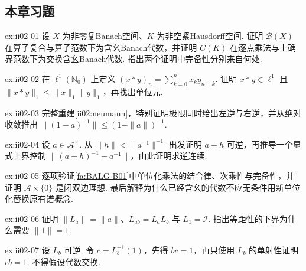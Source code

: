\subsection*{本章习题}\label{sec:ii02-exercises}

\begin{FAExercise}[Banach代数基本例]{ex:ii02-01}
设 \(\displaystyle X\) 为非零复Banach空间、\(\displaystyle K\) 为非空紧Hausdorff空间. 证明 \(\displaystyle\mathcal B(X)\) 在算子复合与算子范数下为含幺Banach代数，并证明 \(\displaystyle C(K)\) 在逐点乘法与上确界范数下为交换含幺Banach代数. 指出两个证明中完备性分别来自何处.
\end{FAExercise}

\begin{FAExercise}[卷积Banach代数]{ex:ii02-02}
在 \(\displaystyle\ell^1(\mathbb N_0)\) 上定义 \(\displaystyle(x*y)_n=\sum_{k=0}^{n}x_k y_{n-k}\). 证明 \(\displaystyle x*y\in\ell^1\) 且 \(\displaystyle\|x*y\|_1\leqslant\|x\|_1\|y\|_1\)，再找出单位元.
\end{FAExercise}

\begin{FAExercise}[Neumann级数]{ex:ii02-03}
完整重建\autoref{ii02:neumann}，特别证明极限同时给出左逆与右逆，并从绝对收敛推出 \(\displaystyle\|(1-a)^{-1}\|\leqslant(1-\|a\|)^{-1}\).
\end{FAExercise}

\begin{FAExercise}[可逆元群与逆映射]{ex:ii02-04}
设 \(\displaystyle a\in\mathcal A^\times\). 从 \(\displaystyle\|h\|<\|a^{-1}\|^{-1}\) 出发证明 \(\displaystyle a+h\) 可逆，再推导一个显式上界控制 \(\displaystyle\|(a+h)^{-1}-a^{-1}\|\)，由此证明求逆连续.
\end{FAExercise}

\begin{FAExercise}[单位化]{ex:ii02-05}
逐项验证\autoref{fa:BALG-B01}中单位化乘法的结合律、次乘性与完备性，并证明 \(\displaystyle\mathcal A\times\{0\}\) 是闭双边理想. 最后解释为什么已经含幺的代数不应无条件用新单位化替换原有谱概念.
\end{FAExercise}

\begin{FAExercise}[左正则表示]{ex:ii02-06}
证明 \(\displaystyle\|L_a\|=\|a\|\)、\(\displaystyle L_{ab}=L_aL_b\) 与 \(\displaystyle L_1=\mathcal I\). 指出等距性的下界为什么需要 \(\displaystyle\|1\|=1\).
\end{FAExercise}

\begin{FAExercise}[代数与算子可逆性]{ex:ii02-07}
设 \(\displaystyle L_b\) 可逆. 令 \(\displaystyle c=L_b^{-1}(1)\)，先得 \(\displaystyle bc=1\)，再只使用 \(\displaystyle L_b\) 的单射性证明 \(\displaystyle cb=1\). 不得假设代数交换.
\end{FAExercise}

